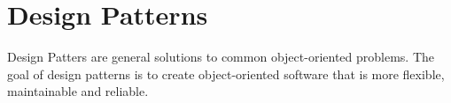 \documentclass[11pt]{article}
\begin{document}
    \section{Design Patterns}
    Design Patters are general solutions to common object-oriented problems. The goal of design patterns is to create
    object-oriented software that is more flexible, maintainable and reliable.
\end{document}
